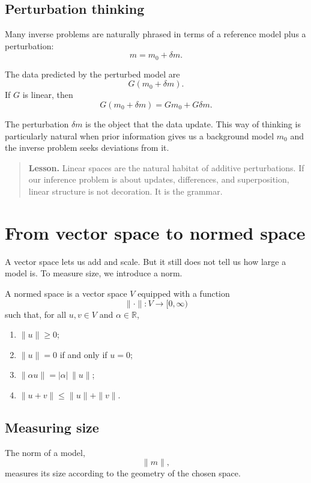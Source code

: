 \documentclass[11pt,a4paper]{book}
\newenvironment{lesson}
  {\begin{quote}\textbf{Lesson.}}
  {\end{quote}}
\newcommand{\R}{\mathbb{R}}
\newcommand{\G}{G}
\begin{document}
\subsection{Perturbation thinking}

Many inverse problems are naturally phrased in terms of a reference model plus
a perturbation:
\[
    m = m_0+\delta m.
\]

The data predicted by the perturbed model are
\[
    \G(m_0+\delta m).
\]
If $\G$ is linear, then
\[
    \G(m_0+\delta m)
    =
    \G m_0+\G\delta m.
\]

The perturbation $\delta m$ is the object that the data update. This way of
thinking is particularly natural when prior information gives us a background
model $m_0$ and the inverse problem seeks deviations from it.

\begin{lesson}
Linear spaces are the natural habitat of additive perturbations.
If our inference problem is about updates, differences, and superposition,
linear structure is not decoration. It is the grammar.
\end{lesson}

\section{From vector space to normed space}

A vector space lets us add and scale. But it still does not tell us how large a
model is. To measure size, we introduce a norm.

A normed space is a vector space $V$ equipped with a function
\[
    \|\cdot\|:V\to[0,\infty)
\]
such that, for all $u,v\in V$ and $\alpha\in\R$,
\begin{enumerate}[label=\arabic*.]
    \item $\|u\|\geq 0$;
    \item $\|u\|=0$ if and only if $u=0$;
    \item $\|\alpha u\|=|\alpha|\,\|u\|$;
    \item $\|u+v\|\leq \|u\|+\|v\|$.
\end{enumerate}

\subsection{Measuring size}

The norm of a model,
\[
    \|m\|,
\]
measures its size according to the geometry of the chosen space.
\end{document}
